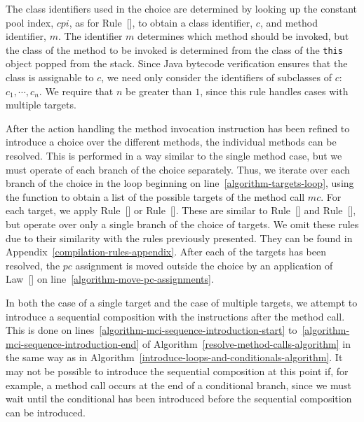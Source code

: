 The class identifiers used in the choice are determined by looking up
the constant pool index, $cpi$, as for
Rule~[], to obtain a class
identifier, $c$, and method identifier, $m$.
The identifier $m$ determines which method should be invoked, but the
class of the method to be invoked is determined from the class of the
\texttt{this} object popped from the stack.
Since Java bytecode verification ensures that the class is assignable
to $c$, we need only consider the identifiers of subclasses of
$c$:~$c_1, \cdots , c_n$.
We require that $n$ be greater than $1$, since this rule handles cases
with multiple targets.

After the action handling the method invocation instruction has been
refined to introduce a choice over the different methods, the
individual methods can be resolved.
This is performed in a way similar to the single method case, but we
must operate of each branch of the choice separately.
Thus, we iterate over each branch of the choice in the loop beginning
on line~\ref{algorithm-targets-loop}, using the function
 to obtain a list of the possible targets of the
method call $mc$.
For each target, we apply
Rule~[] or
Rule~[].
These are similar to Rule~[] and
Rule~[], but operate over only a
single branch of the choice of targets.
We omit these rules due to their similarity with the rules previously
presented.
They can be found in Appendix~\ref{compilation-rules-appendix}.
After each of the targets has been resolved, the $pc$ assignment is
moved outside the choice by an application of
Law~[] on
line~\ref{algorithm-move-pc-assignments}.

In both the case of a single target and the case of multiple targets,
we attempt to introduce a sequential composition with the instructions
after the method call.
This is done on lines~\ref{algorithm-mci-sequence-introduction-start}
to~\ref{algorithm-mci-sequence-introduction-end} of
Algorithm~\ref{resolve-method-calls-algorithm} in the same way as in
Algorithm~\ref{introduce-loops-and-conditionals-algorithm}.
It may not be possible to introduce the sequential composition at this
point if, for example, a method call occurs at the end of a
conditional branch, since we must wait until the conditional has been
introduced before the sequential composition can be introduced.

